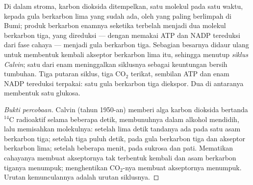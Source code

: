 \begin{proposition}\label{prop:g12:photosynthesis:calvin}
Di dalam stroma, karbon dioksida ditempelkan, satu molekul pada satu
waktu, kepada gula berkarbon lima yang sudah ada, oleh  yang
paling berlimpah di Bumi; produk berkarbon enamnya seketika terbelah
menjadi dua molekul berkarbon tiga, yang direduksi --- dengan memakai
ATP dan NADP tereduksi dari fase cahaya --- menjadi gula berkarbon
tiga. Sebagian besarnya didaur ulang untuk membentuk kembali akseptor
berkarbon lima itu, sehingga menutup \emph{siklus Calvin}; satu dari enam meninggalkan siklusnya sebagai keuntungan
bersih tumbuhan. Tiga putaran siklus, tiga $\mathrm{CO_2}$ terikat,
sembilan ATP dan enam NADP tereduksi terpakai: satu gula berkarbon
tiga diekspor. Dua di antaranya membentuk satu glukosa.
\end{proposition}
\begin{proof}[Bukti percobaan]
Calvin (tahun 1950-an) memberi alga karbon dioksida bertanda $^{14}$C
radioaktif selama beberapa detik, membunuhnya dalam alkohol mendidih,
lalu memisahkan molekulnya: setelah lima detik tandanya ada pada satu
asam berkarbon tiga; setelah tiga puluh detik, pada gula berkarbon tiga
dan akseptor berkarbon lima; setelah beberapa menit, pada sukrosa dan
pati. Mematikan cahayanya membuat akseptornya tak terbentuk kembali dan
asam berkarbon tiganya menumpuk; menghentikan $\mathrm{CO_2}$-nya
membuat akseptornya menumpuk. Urutan kemunculannya adalah urutan
siklusnya.
\end{proof}

